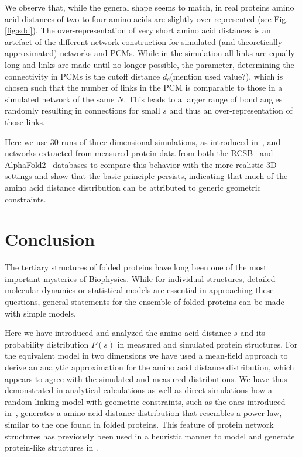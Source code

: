 \documentclass[
reprint,
twocolumn,
amsmath,amssymb,superscriptaddress,aps,
pre]{revtex4-1}
\newcommand{\blue}[1]{\textcolor{blue!80!black}{#1}}
\begin{document}
We observe that, while the general shape seems to match, in real proteins amino acid distances of two to four amino acids are slightly over-represented (see Fig.\ref{fig:sdd}).
The over-representation of very short amino acid distances is an artefact of the different network construction for simulated (and theoretically approximated) networks and PCMs. While in the simulation all links are equally long and links are made until no longer possible, the parameter, determining the connectivity in PCMs is the cutoff distance $d_c$\blue{(mention used value?)}, which is chosen such that the number of links in the PCM is comparable to those in a simulated network of the same $N$. This leads to a larger range of bond angles randomly resulting in connections for small $s$ and thus an over-representation of those links.


Here we use 30 runs of three-dimensional simulations, as introduced in~\cite{molkenthin2020self}, and networks extracted from measured protein data from both the RCSB~\cite{PDB} and AlphaFold2~\cite{} databases to compare this behavior with the more realistic 3D settings and show that the basic principle persists, indicating that much of the amino acid distance distribution can be attributed to generic geometric constraints.
\section{Conclusion}
The tertiary structures of folded proteins have long been one of the most important mysteries of Biophysics. While for individual structures, detailed molecular dynamics or statistical models are essential in approaching these questions, general statements for the ensemble of folded proteins can be made with simple models.

Here we have introduced and analyzed the amino acid distance $s$ and its probability distribution $P(s)$ in measured and simulated protein structures. For the equivalent model in two dimensions we have used a mean-field approach to derive an analytic approximation for the amino acid distance distribution, which appears to agree with the simulated and measured distributions.
We have thus demonstrated in analytical calculations as well as direct simulations how a random linking model with geometric constraints, such as the ones introduced in~\cite{molkenthin2016scaling, molkenthin2020self}, generates a amino acid distance distribution that resembles a power-law, similar to the one found in folded proteins. This feature of protein network structures has previously been used in a heuristic manner to model and generate protein-like structures in \cite{bartoli2008effecta}.
\end{document}
